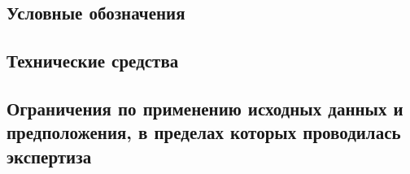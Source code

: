 \subsection{Условные обозначения}


\subsection{Технические средства}


\subsection{Ограничения по применению исходных данных и предположения, в пределах которых проводилась экспертиза}


%
%
%

%
%
%
%
%
%
%
%
%
%


 
